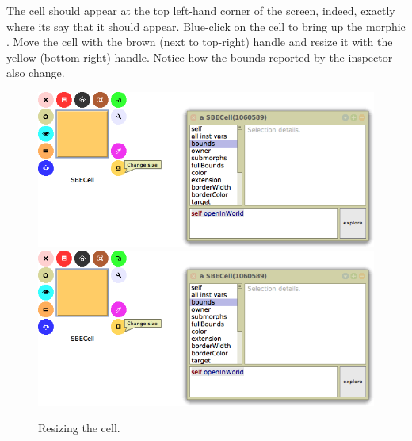 \documentclass[a4paper,10pt,twoside]{book}
\begin{document}
The cell should appear at the top left-hand corner of the screen, indeed, exactly where its  say that it should appear.
Blue-click on the cell to bring up the morphic .
Move the cell with the brown (next to top-right) handle and resize it with the yellow (bottom-right) handle.
Notice how the bounds reported by the inspector also change.

\begin{figure}[htbp]
\centering
\ifluluelse
	{\includegraphics[width=\textwidth]{SBECellResize} }
	{\includegraphics[scale=0.7]{SBECellResize} }
\caption{Resizing the cell.\label{fig:cellresize}}
\end{figure}
\end{document}

